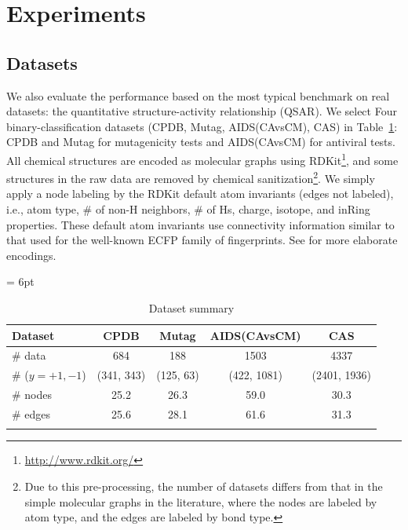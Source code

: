 \section{Experiments}
\subsection{Datasets}
We also evaluate the performance based on the most typical benchmark on real datasets:
the quantitative structure-activity relationship (QSAR). 
We select Four binary-classification datasets (CPDB, Mutag, AIDS(CAvsCM), CAS) in Table~\ref{tbl:dataset}: 
CPDB and Mutag for mutagenicity tests and AIDS(CAvsCM) for antiviral tests.
All chemical structures are encoded as molecular graphs using RDKit\footnote{\url{http://www.rdkit.org/}}, 
and some structures in the raw data are removed by chemical sanitization\footnote{
Due to this pre-processing, the number of datasets differs from that 
in the simple molecular graphs in the literature, 
where the nodes are labeled by atom type, and the edges are labeled by bond type.}.
We simply apply a node labeling by the RDKit default atom invariants (edges not labeled), i.e., 
atom type, \# of non-H neighbors, \# of Hs, charge, isotope, and inRing properties. 
These default atom invariants use connectivity information similar to that used for the well-known 
ECFP family of fingerprints\cite{Rogers:2010}. See \cite{Kearnes2016} for more elaborate encodings.

\tabcolsep = 6pt
\begin{table}[h]
  \centering
  \caption{Dataset summary}
  \label{tbl:dataset}
  	\begin{tabular}{lcccc}
		\thickhline
		Dataset			& CPDB           & Mutag        & AIDS(CAvsCM)     & CAS	\\  \hline
		\# data			& 684            & 188          & 1503             & 4337	\\
		\# ($y=+1,-1$)	& (341, 343)     & (125, 63)    & (422, 1081)      & (2401, 1936)	\\  
		\# nodes		& 25.2           & 26.3         & 59.0             & 30.3	\\  
		\# edges		& 25.6           & 28.1         & 61.6             & 31.3	\\  
		\thickhline
		\end{tabular}
\end{table}

